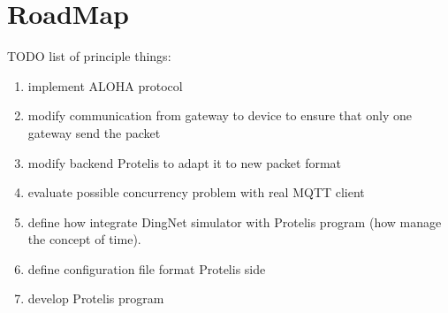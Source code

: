\chapter{RoadMap}

TODO list of principle things:
\begin{enumerate}
    \item implement ALOHA protocol
    \item modify communication from gateway to device to ensure that only one gateway send the packet
    \item modify backend Protelis to adapt it to new packet format
    \item evaluate possible concurrency problem with real MQTT client
    \item define how integrate DingNet simulator with Protelis program (how manage the concept of time).
    \item define configuration file format Protelis side
    \item develop Protelis program
\end{enumerate}